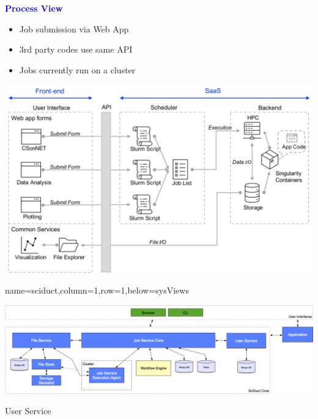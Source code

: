 \documentclass[landscape,paperwidth=70in,paperheight=46in,fontscale=0.225]{baposter} %
\begin{document}
\begin{poster}
{\begin{center}
\textcolor{blue}{\large\textbf{Process View}}
\end{center}
\vspace{-5mm}
\begin{minipage}{.24\textwidth}
\begin{itemize}[leftmargin=*,noitemsep,topsep=0pt]
\item Job submission via Web App
\item 3rd party codes use same API
\item Jobs currently run on a cluster
\end{itemize}
\end{minipage}
\qquad
\begin{minipage}{.73\textwidth}
\vspace{5mm}
\includegraphics[scale=0.20]{figures/netsci_ops_v6.pdf}
\end{minipage}

}

          {name=sciduct,column=1,row=1,below=sysViews}{
          
\includegraphics[scale=0.27]{figures/sciduct.png}

\vspace{5mm}
\noindent 
\begin{minipage}[t]{0.32\columnwidth}
User Service


\end{minipage}}
\end{poster}
\end{document}
